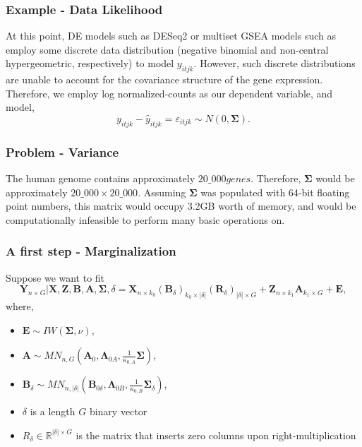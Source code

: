 \documentclass{beamer}
\begin{document}
\begin{frame}
  \frametitle{Example - Data Likelihood}
  At this point, DE models such as DESeq2 or multiset GSEA models such as~\cite{Cao-2013-hypergeom} employ some discrete data distribution (negative binomial and non-central hypergeometric, respectively) to model $y_{itjk}$.
  \vfill
  However, such discrete distributions are unable to account for the covariance structure of the gene expression. 
  Therefore, we employ log normalized-counts as our dependent variable, and model,
  \[
    y_{itjk} - \hat y_{itjk} = \varepsilon_{itjk} \sim N(0, \mathbf \Sigma).
  \]
\end{frame}


\begin{frame}
  \frametitle{Problem - Variance}
  The human genome contains approximately $20\_000 genes$. 
  Therefore, $\mathbf \Sigma$ would be approximately $20\_000\times 20\_000$. 
  Assuming $\mathbf \Sigma$ was populated with 64-bit floating point numbers, this matrix would occupy 3.2GB worth of memory, and would be computationally infeasible to perform many basic operations on. 
\end{frame}

\begin{frame}
  \frametitle{A first step - Marginalization }
  Suppose we want to fit 
  \[
    \mathbf Y_{n\times G} | \mathbf X, \mathbf Z, \mathbf B, \mathbf A, \mathbf \Sigma, \delta = 
      \mathbf X_{n\times k_0} (\mathbf B_\delta)_{k_0 \times |\delta|}(\mathbf R_\delta)_{|\delta|\times G} + 
      \mathbf Z_{n \times k_1} \mathbf A_{k_1 \times G} + 
      \mathbf E,
  \]
  where,
  \begin{itemize}
    \item $\mathbf E \sim IW(\mathbf\Sigma, \nu)$,
    \item $\mathbf A \sim MN_{n,G}(\mathbf A_0, \mathbf\Lambda_{0A}, \frac{1}{\kappa_{0,A}}\mathbf\Sigma)$,
    \item $\mathbf B_\delta \sim MN_{n, |\delta|}(\mathbf B_{0\delta}, \mathbf\Lambda_{0B}, \frac{1}{\kappa_{0, B}}\mathbf\Sigma_\delta)$,
    \item $\delta$ is a length $G$ binary vector 
    \item $R_\delta\in\mathbb R^{|\delta|\times G}$ is the matrix that inserts zero columns upon right-multiplication 
  \end{itemize}
\end{frame}
\end{document}
